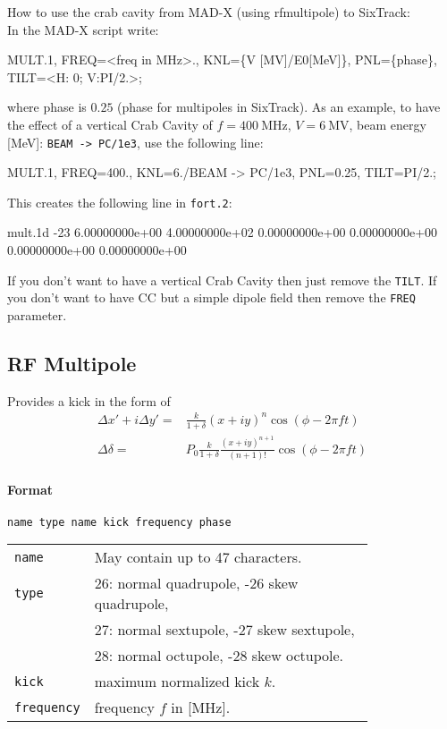 \noindent How to use the crab cavity from MAD-X (using rfmultipole) to SixTrack:\\
\bigskip
\noindent In the MAD-X script write:
\begin{cverbatim}
MULT.1, FREQ=<freq in MHz>., KNL=\{V [MV]/E0[MeV]\}, PNL=\{phase\}, TILT=<H: 0; V:PI/2.>;
\end{cverbatim}
where phase is $0.25$ (phase for multipoles in SixTrack).
As an example, to have the effect of a vertical Crab Cavity of $f=400~\mathrm{MHz}$, $V=6~\mathrm{MV}$, beam energy [MeV]: \texttt{BEAM -> PC/1e3}, use the following line:\\
\begin{cverbatim}
MULT.1, FREQ=400., KNL={6./BEAM -> PC/1e3}, PNL={0.25}, TILT=PI/2.;
\end{cverbatim}
This creates the following line in \texttt{fort.2}:
\begin{cverbatim}
mult.1d  -23  6.00000000e+00  4.00000000e+02  0.00000000e+00  0.00000000e+00  0.00000000e+00  0.00000000e+00
\end{cverbatim}
If you don’t want to have a vertical Crab Cavity then just remove the \texttt{TILT}.
If you don’t want to have CC but a simple dipole field then remove the \texttt{FREQ} parameter.

\subsection{RF Multipole}

Provides a kick in the form of
\begin{align}
    \Delta x'+i\Delta y' =& \frac{k}{1+\delta} (x+iy)^n \cos (\phi - 2 \pi f t) \\
    \Delta \delta =& P_0 \frac{k}{1+\delta} \frac{(x+iy)^{n+1}}{(n+1)!} \cos (\phi - 2 \pi f t)
\end{align}

\paragraph{Format} \texttt{name type name kick frequency phase}

\bigskip
\begin{tabular}{@{}lp{0.8\linewidth}}
    \texttt{name} & May contain up to 47 characters. \\
    \texttt{type} & 26: normal quadrupole, -26 skew quadrupole, \\
                  & 27: normal sextupole, -27 skew sextupole, \\
                  & 28: normal octupole, -28 skew octupole. \\
    \texttt{kick} & maximum normalized kick $k$. \\
    \texttt{frequency} & frequency $f$ in [MHz].
\end{tabular}

